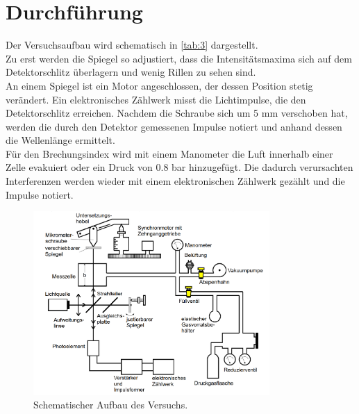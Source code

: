 \section{Durchführung}
\label{sec:Durchführung}

Der Versuchsaufbau wird schematisch in \autoref{tab:3} dargestellt.\\
Zu erst werden die Spiegel so adjustiert, dass die Intensitätsmaxima sich auf dem Detektorschlitz überlagern und wenig Rillen zu sehen sind. \\
An einem Spiegel ist ein Motor angeschlossen, der dessen Position stetig verändert. Ein elektronisches Zählwerk misst die Lichtimpulse, die den Detektorschlitz erreichen. Nachdem die Schraube sich um 5 mm verschoben hat, werden die durch den Detektor gemessenen Impulse notiert und anhand dessen die Wellenlänge ermittelt.\\
Für den Brechungsindex wird mit einem Manometer die Luft innerhalb einer Zelle evakuiert oder ein Druck von 0.8 bar hinzugefügt. Die dadurch verursachten Interferenzen werden wieder mit einem elektronischen Zählwerk gezählt und die Impulse notiert.
\begin{figure}[H]
  \centering
  \includegraphics[width=9cm]{content/3.png}
  \caption{Schematischer Aufbau des Versuchs.}
  \label{tab:3}
\end{figure}
